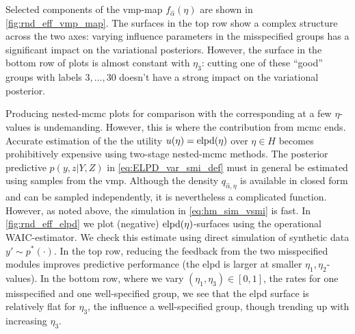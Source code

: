 Selected components of the \acrshort*{vmp}-map $f_{\hat\alpha}(\eta)$ are shown in \cref{fig:rnd_eff_vmp_map}. The surfaces in the top row show a complex structure across the two axes: varying influence parameters in the misspecified groups has a significant impact on the variational posteriors.
However, the surface in the bottom row of plots is almost constant with $\eta_3$: cutting one of these ``good'' groups with labels $3,...,30$ doesn't have a strong impact on the variational posterior.

Producing nested-\acrshort*{mcmc} plots for comparison with the corresponding  at a few $\eta$-values is undemanding. However, this is where the contribution from \acrshort*{mcmc} ends. Accurate estimation of the the utility $u(\eta)=\operatorname{\text{elpd}}(\eta)$ over $\eta\in H$ becomes prohibitively expensive using two-stage nested-\acrshort*{mcmc} methods.
The posterior predictive $p(y,z|Y,Z)$ in \cref{eq:ELPD_var_smi_def} must in general be estimated using samples from the \acrshort*{vmp}. Although the density $q_{\hat\alpha,\eta}$ is available in closed form and can be sampled independently, it is nevertheless a complicated function.  However, as noted above, the simulation in \cref{eq:hm_sim_vsmi} is fast. In \cref{fig:rnd_eff_elpd} we plot (negative) $\operatorname{\text{elpd}}(\eta)$-surfaces using the operational WAIC-estimator. We check this estimate using direct simulation of synthetic data $y'\sim p^*(\cdot)$. In the top row, reducing the feedback from the two misspecified modules improves predictive performance (the \acrshort*{elpd} is larger at smaller $\eta_1,\eta_2$-values).
In the bottom row, where we vary $(\eta_1,\eta_3)\in[0,1]$, the rates for one misspecified and one well-specified group, we see that the \acrshort*{elpd} surface is relatively flat for $\eta_3$, the influence a well-specified group, though trending up with increasing $\eta_3$. 

